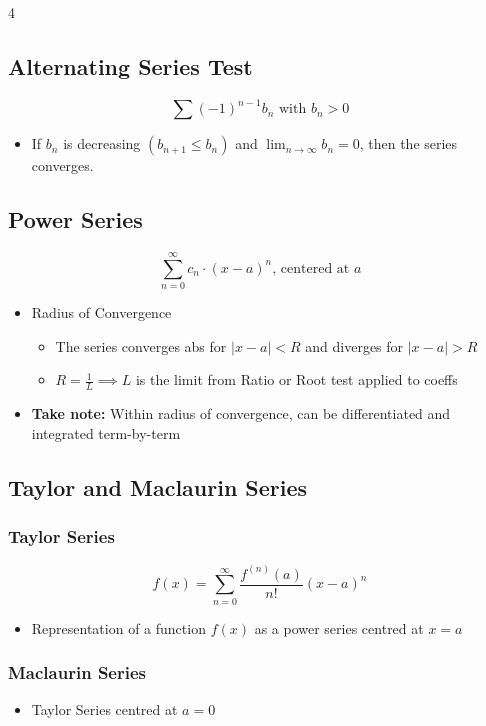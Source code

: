 \documentclass[8pt, landscape, a4paper]{scrartcl}
\begin{document}
\begin{multicols*}{4}
    \subsection*{Alternating Series Test}
    \[
        \sum {(-1)}^{n-1}b_n \text{ with } b_n > 0
    \]
    \begin{itemize}
        \item If $b_n$ is decreasing $(b_{n+1} \leq b_n)$ and $\lim_{n\to\infty}b_n = 0$, then the series converges.
    \end{itemize}

    \subsection*{Power Series}
    \[
        \sum_{n = 0}^{\infty} c_n \cdot {(x-a)}^n \text{, centered at } a
    \]
    \begin{itemize}
        \item Radius of Convergence
        \begin{itemize} 
            \item The series converges abs for $|x-a| < R$ and diverges for $|x-a| > R$
            \item $R = \frac{1}{L} \implies L$ is the limit from Ratio or Root test applied to coeffs
        \end{itemize}
        \item \textbf{Take note:} Within radius of convergence, can be differentiated and integrated term-by-term
    \end{itemize}

\subsection*{Taylor and Maclaurin Series}
\subsubsection*{Taylor Series}
\[
    f(x)=\sum_{n=0}^\infty \frac{f^{(n)}(a)}{n!}{(x-a)}^n
\]
\begin{itemize}
    \item Representation of a function $f(x)$ as a power series centred at $x=a$
\end{itemize}

\subsubsection*{Maclaurin Series}
\begin{itemize}
    \item Taylor Series centred at $a=0$
\end{itemize}


\end{multicols*}
\end{document}
